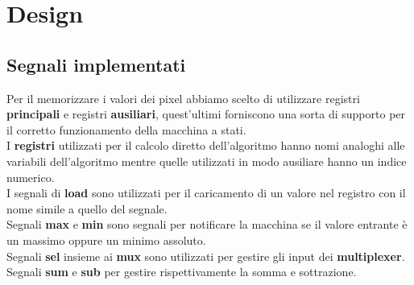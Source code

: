 \documentclass[a4paper, 12pt]{report}
\begin{document}
	\chapter{Design}
		\section{Segnali implementati}
			Per il memorizzare i valori dei pixel abbiamo scelto di utilizzare registri \textbf{principali} e registri \textbf{ausiliari}, quest'ultimi forniscono una sorta di supporto per il corretto funzionamento della macchina a 					stati.\\
			I \textbf{registri} utilizzati per il calcolo diretto dell'algoritmo hanno nomi analoghi alle variabili dell'algoritmo mentre quelle utilizzati in modo ausiliare hanno un indice numerico.\\
			I segnali di \textbf{load} sono utilizzati per il caricamento di un valore nel registro con il nome simile a quello del segnale.\\
			Segnali \textbf{max} e \textbf{min} sono segnali per notificare la macchina se il valore entrante è un massimo oppure un minimo assoluto.\\
			Segnali \textbf{sel} insieme ai \textbf{mux} sono utilizzati per gestire gli input dei \textbf{multiplexer}.\\
			Segnali \textbf{sum} e \textbf{sub} per gestire rispettivamente la somma e sottrazione.\\ 
\end{document}
